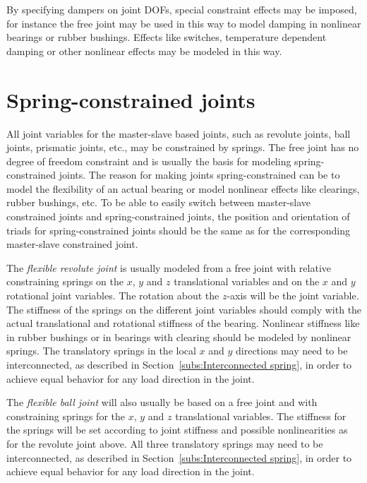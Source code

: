 By specifying dampers on joint DOFs, special constraint effects may be imposed,
for instance the free joint may be used in this way to model damping in
nonlinear bearings or rubber bushings.
Effects like switches, temperature dependent damping or other nonlinear
effects may be modeled in this way.

\section{Spring-constrained joints}
\label{s:Spring-constrained joints}

All joint variables for the master-slave based joints, such as revolute joints,
ball joints, prismatic joints, etc., may be constrained by springs.
The free joint has no degree of freedom constraint and is usually the basis for
modeling spring-constrained joints.
The reason for making joints spring-constrained can be to model the flexibility
of an actual bearing or model nonlinear effects like clearings, rubber bushings,
etc.
To be able to easily switch between master-slave constrained joints and
spring-constrained joints, the position and orientation of triads for
spring-constrained joints should be the same as for the corresponding
master-slave constrained joint.

The {\it flexible revolute joint} is usually modeled from a free joint with
relative constraining springs on the $x$, $y$ and $z$ translational variables
and on the $x$ and $y$ rotational joint variables.
The rotation about the $z$-axis will be the joint variable.
The stiffness of the springs on the different joint variables should comply with
the actual translational and rotational stiffness of the bearing.
Nonlinear stiffness like in rubber bushings or in bearings with clearing should
be modeled by nonlinear springs.
The translatory springs in the local $x$ and $y$ directions may need to be
interconnected, as described in Section~\ref{subs:Interconnected spring},
in order to achieve equal behavior for any load direction in the joint.

The {\it flexible ball joint} will also usually be based on a free joint and
with constraining springs for the $x$, $y$ and $z$ translational variables.
The stiffness for the springs will be set according to joint stiffness and
possible nonlinearities as for the revolute joint above.
All three translatory springs may need to be interconnected, as described in
Section~\ref{subs:Interconnected spring}, in order to achieve equal
behavior for any load direction in the joint.

